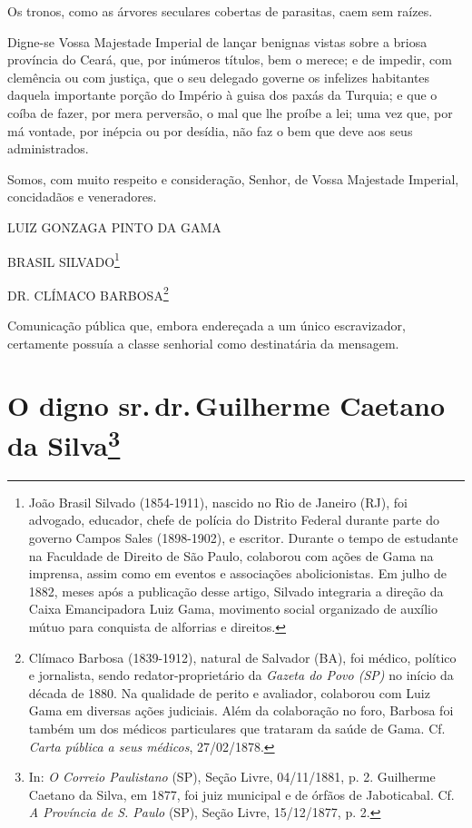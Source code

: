 {Os tronos, como as árvores seculares cobertas de parasitas, caem sem
raízes.

Digne-se Vossa Majestade Imperial de lançar benignas vistas sobre a
briosa província do Ceará, que, por inúmeros títulos, bem o merece; e de
impedir, com clemência ou com justiça, que o seu delegado governe os
infelizes habitantes daquela importante porção do Império à guisa dos
paxás da Turquia; e que o coíba de fazer, por mera perversão, o mal que
lhe proíbe a lei; uma vez que, por má vontade, por inépcia ou por
desídia, não faz o bem que deve aos seus administrados.

Somos, com muito respeito e consideração, Senhor, de Vossa Majestade
Imperial, concidadãos e veneradores.

LUIZ GONZAGA PINTO DA GAMA

BRASIL SILVADO\footnote{João Brasil Silvado (1854-1911), nascido no
  Rio de Janeiro (RJ), foi advogado, educador, chefe de polícia do
  Distrito Federal durante parte do governo Campos Sales (1898-1902), e
  escritor. Durante o tempo de estudante na Faculdade de Direito de São
  Paulo, colaborou com ações de Gama na imprensa, assim como em eventos
  e associações abolicionistas. Em julho de 1882, meses após a
  publicação desse artigo, Silvado integraria a direção da Caixa
  Emancipadora Luiz Gama, movimento social organizado de auxílio mútuo
  para conquista de alforrias e direitos.}

DR. CLÍMACO BARBOSA\footnote{Clímaco Barbosa (1839-1912), natural de
  Salvador (BA), foi médico, político e jornalista, sendo
  redator-proprietário da \emph{Gazeta do Povo (SP)} no início da década
  de 1880. Na qualidade de perito e avaliador, colaborou com Luiz Gama
  em diversas ações judiciais. Além da colaboração no foro, Barbosa foi
  também um dos médicos particulares que trataram da saúde de Gama. Cf.
  \emph{Carta pública a seus médicos}, 27/02/1878.}

\pagebreak
\mbox{}\vfill
\thispagestyle{empty}

{\small\noindent
Comunicação pública que, embora endereçada a um único
escravizador, certamente possuía a classe senhorial como destinatária da
mensagem.}

\chapter{O digno sr.\,dr.\,Guilherme Caetano da Silva\footnote[*]{In:
  \emph{O Correio Paulistano} (SP), Seção Livre, 04/11/1881, p. 2.
  Guilherme Caetano da Silva, em 1877, foi juiz municipal e de órfãos de
  Jaboticabal. Cf. \emph{A Província de S. Paulo} (SP), Seção Livre,
  15/12/1877, p. 2.}}


}
